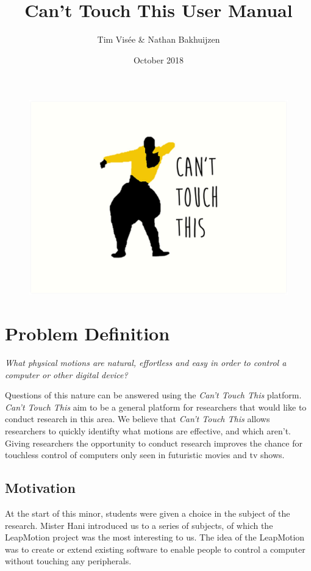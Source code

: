 \documentclass[a4paper]{article}
\title{Can't Touch This User Manual}
\author{Tim Visée \& Nathan Bakhuijzen}
\date{October 2018}
\begin{document}
  \maketitle
  \begin{figure}[h]
    \centering
    \includegraphics[width=\linewidth]{cant-touch-this}
  \end{figure}
  \clearpage

  \section{Problem Definition}
  \textit{What physical motions are natural, effortless and easy in order to
    control a computer or other digital device?}

  Questions of this nature can be answered using the \textit{Can't Touch This}
  platform. \textit{Can't Touch This} aim to be a general platform for
  researchers that would like to conduct research in this area. We believe that
  \textit{Can't Touch This} allows researchers to quickly identifty what motions
  are effective, and which aren't. Giving researchers the opportunity to conduct
  research improves the chance for touchless control of computers only seen
  in futuristic movies and tv shows.

  \subsection{Motivation}
  At the start of this minor, students were given a choice in the subject of the
  research. Mister Hani introduced us to a series of subjects, of which the
  LeapMotion project was the most interesting to us. The idea of the LeapMotion
  was to create or extend existing software to enable people to control a
  computer without touching any peripherals.
\end{document}
